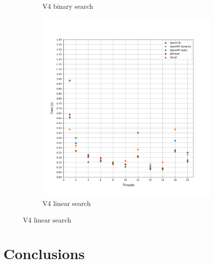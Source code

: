 \documentclass[12pt, a4paper]{article}
\begin{document}
\begin{figure}[h!]
\begin{subfigure}[b]{0.33\textwidth}
         \caption{V4 binary search}
     \end{subfigure}
     \begin{subfigure}[b]{0.33\textwidth}
         \centering
         \includegraphics[height=.4\textheight, width=\textwidth, keepaspectratio]{assets/NACA0015/v4_linear.png}
         \caption{V4 linear search} 
     \end{subfigure}
\end{figure}

\section{Conclusions}
\vspace{0.5cm}
\end{document}
